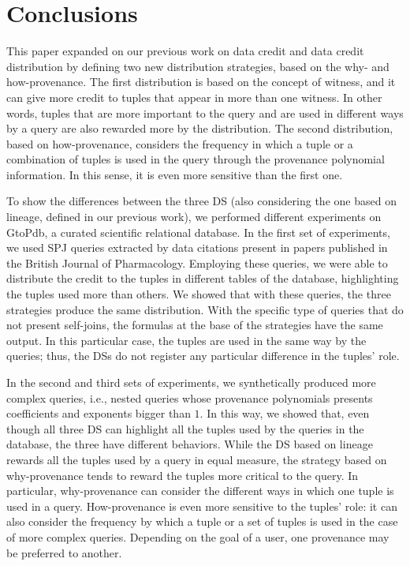 \section{Conclusions}
\label{section:conclusions}

This paper expanded on our previous work on data credit and data credit distribution by defining two new distribution strategies, based on the why- and how-provenance. 
The first distribution is based on the concept of witness, and it can give more credit to tuples that appear in more than one witness. 
In other words, tuples that are more important to the query and are used in different ways by a query are also rewarded more by the distribution.
The second distribution, based on how-provenance, considers the frequency in which a tuple or a combination of tuples is used in the query through the provenance polynomial information. In this sense, it is even more sensitive than the first one.

To show the differences between the three DS (also considering the one based on lineage, defined in our previous work), we performed different experiments on GtoPdb, a curated scientific relational database. 
In the first set of experiments, we used SPJ queries extracted by data citations present in papers published in the British Journal of Pharmacology. 
Employing these queries, we were able to distribute the credit to the tuples in different tables of the database, highlighting the tuples used more than others. 
We showed that with these queries, the three strategies produce the same distribution. With the specific type of queries that do not present self-joins, the formulas at the base of the strategies have the same output. In this particular case, the tuples are used in the same way by the queries; thus, the DSs do not register any particular difference in the tuples' role.

In the second and third sets of experiments, we synthetically produced more complex queries, i.e., nested queries whose provenance polynomials presents coefficients and exponents bigger than $1$.
In this way, we showed that, even though all three DS can highlight all the tuples used by the queries in the database, the three have different behaviors. 
While the DS based on lineage rewards all the tuples used by a query in equal measure, the strategy based on why-provenance tends to reward the tuples more critical to the query. 
In particular, why-provenance can consider the different ways in which one tuple is used in a query.  
How-provenance is even more sensitive to the tuples' role: it can also consider the frequency by which a tuple or a set of tuples is used in the case of more complex queries. Depending on the goal of a user, one provenance may be preferred to another. 

